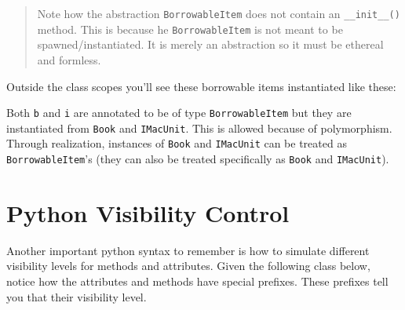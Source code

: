\begin{quote}
Note how the abstraction \texttt{BorrowableItem} does not contain an
\texttt{\_\_init\_\_()} method. This is because he
\texttt{BorrowableItem} is not meant to be spawned/instantiated. It is
merely an abstraction so it must be ethereal and formless.
\end{quote}

Outside the class scopes you'll see these borrowable items instantiated
like these:

\begin{Shaded}
\begin{Highlighting}[]
\OperatorTok{=}\NormalTok{)}
\OperatorTok{=}\NormalTok{)}
\end{Highlighting}
\end{Shaded}

Both \texttt{b} and \texttt{i} are annotated to be of type
\texttt{BorrowableItem} but they are instantiated from \texttt{Book} and
\texttt{IMacUnit}. This is allowed because of polymorphism. Through
realization, instances of \texttt{Book} and \texttt{IMacUnit} can be
treated as \texttt{BorrowableItem}'s (they can also be treated
specifically as \texttt{Book} and \texttt{IMacUnit}).

\section{Python Visibility
Control}\label{oopython.md__python-visibility-control}

Another important python syntax to remember is how to simulate different
visibility levels for methods and attributes. Given the following class
below, notice how the attributes and methods have special prefixes.
These prefixes tell you that their visibility level.

